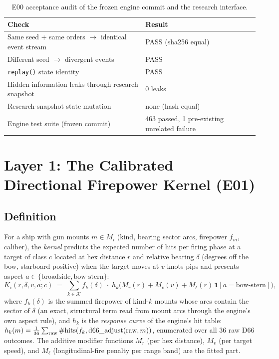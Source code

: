 \documentclass[12pt,a4paper]{article}
\begin{document}
\begin{table}[t]
\centering\small
\caption{E00 acceptance audit of the frozen engine commit and the research
interface.}
\label{tab:e00}
\begin{tabular}{p{8.6cm}p{5.6cm}}
\toprule
Check & Result \\
\midrule
Same seed + same orders $\to$ identical event stream & PASS (sha256 equal) \\
Different seed $\to$ divergent events & PASS \\
\texttt{replay()} state identity & PASS \\
Hidden-information leaks through research snapshot & 0 leaks \\
Research-snapshot state mutation & none (hash equal) \\
Engine test suite (frozen commit) & 463 passed, 1 pre-existing unrelated failure \\
\bottomrule
\end{tabular}
\end{table}

\section{Layer 1: The Calibrated Directional Firepower Kernel (E01)}
\label{sec:kernel}

\subsection{Definition}
For a ship with gun mounts $m\in M_i$ (kind, bearing sector arcs,
firepower $f_m$, caliber), the \emph{kernel} predicts the expected number
of hits per firing phase at a target of class $c$ located at hex distance
$r$ and relative bearing $\delta$ (degrees off the bow, starboard
positive) when the target moves at $v$ knots-pips and presents aspect
$a\in\{\text{broadside},\text{bow-stern}\}$:
\begin{equation}
K_i(r,\delta,v,a;c)\;=\;\sum_{k\in\mathcal{K}}
f_k(\delta)\;\cdot\;h_{k}\!\big(M_r(r)+M_v(v)+M_\ell(r)\,\mathbf{1}[a=\text{bow-stern}]\big),
\label{eq:kernel}
\end{equation}
where $f_k(\delta)$ is the summed firepower of kind-$k$ mounts whose arcs
contain the sector of $\delta$ (an exact, structural term read from mount
arcs through the engine's own aspect rule), and $h_k$ is the
\emph{response curve} of the engine's hit table: $h_k(m)=\frac1{36}\sum_{\text{raw}}\#
\text{hits}(f_k,\textnormal{d66\_adjust}(\text{raw},m))$, enumerated over
all 36 raw D66 outcomes.  The additive modifier functions $M_r$ (per hex
distance), $M_v$ (per target speed), and $M_\ell$ (longitudinal-fire
penalty per range band) are the fitted part.
\end{document}

